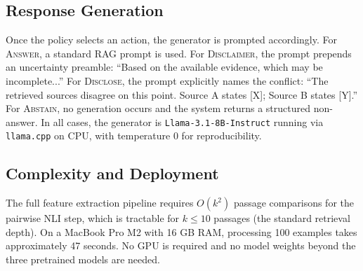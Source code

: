 \subsection{Response Generation}

Once the policy selects an action, the generator is prompted accordingly. For \textsc{Answer}, a standard RAG prompt is used. For \textsc{Disclaimer}, the prompt prepends an uncertainty preamble: ``Based on the available evidence, which may be incomplete...'' For \textsc{Disclose}, the prompt explicitly names the conflict: ``The retrieved sources disagree on this point. Source A states [X]; Source B states [Y].'' For \textsc{Abstain}, no generation occurs and the system returns a structured non-answer. In all cases, the generator is \texttt{Llama-3.1-8B-Instruct} running via \texttt{llama.cpp} on CPU, with temperature 0 for reproducibility.

\subsection{Complexity and Deployment}

The full feature extraction pipeline requires $O(k^2)$ passage comparisons for the pairwise NLI step, which is tractable for $k \leq 10$ passages (the standard retrieval depth). On a MacBook Pro M2 with 16 GB RAM, processing 100 examples takes approximately 47 seconds. No GPU is required and no model weights beyond the three pretrained models are needed.
